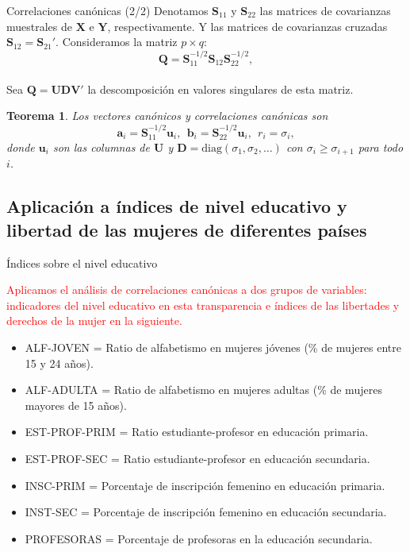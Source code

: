\documentclass{beamer}
\newtheorem{teor}{Teorema}[section]
\begin{document}
\begin{frame}{Correlaciones canónicas (2/2)}
Denotamos $\mathbf{S}_{11}$ y $\mathbf{S}_{22}$ las matrices de covarianzas muestrales de $\mathbf{X}$ e $\mathbf{Y}$, respectivamente. Y las matrices de covarianzas cruzadas $\mathbf{S}_{12} = \mathbf{S}_{21}'$.
Consideramos la matriz $p \times q$:
\begin{equation*}
    \mathbf{Q} = \mathbf{S}_{11}^{-1/2}\mathbf{S}_{12}\mathbf{S}_{22}^{-1/2},
\end{equation*}\\
Sea $\mathbf{Q = UDV'}$ la descomposición en valores singulares de esta matriz.
\begin{teor}
    Los vectores canónicos y correlaciones canónicas son
    \begin{equation*}
        \mathbf{a}_i = \mathbf{S}_{11}^{-1/2}\mathbf{u}_i,\ \  \mathbf{b}_i = \mathbf{S}_{22}^{-1/2}\mathbf{u}_i,\ \  r_i = \sigma_i,
    \end{equation*}
    donde $\mathbf{u}_i$ son las columnas de $\mathbf{U}$ y $\mathbf{D} = \mbox{diag}(\sigma_1, \sigma_2, \ldots)$ con $\sigma_i \geq \sigma_{i+1}$ para todo $i$.
\end{teor}
    
\end{frame}

\subsection{Aplicación a índices de nivel educativo y libertad de las mujeres de diferentes países}
\begin{frame}{Índices sobre el nivel educativo}
\begin{footnotesize}
\textcolor{red}{Aplicamos el análisis de correlaciones canónicas a dos grupos de variables: indicadores del nivel educativo en esta transparencia e índices de las libertades y derechos de la mujer en la siguiente.}
\begin{itemize}
    \item ALF-JOVEN = Ratio de alfabetismo en mujeres jóvenes (\% de mujeres entre 15 y 24 años).
    \item ALF-ADULTA = Ratio de alfabetismo en mujeres adultas (\% de mujeres mayores de 15 años).
    \item EST-PROF-PRIM = Ratio estudiante-profesor en educación primaria.
    \item EST-PROF-SEC = Ratio estudiante-profesor en educación secundaria.
    \item INSC-PRIM = Porcentaje de inscripción femenino en educación primaria.
    \item INST-SEC = Porcentaje de inscripción femenino en educación secundaria.
    \item PROFESORAS = Porcentaje de profesoras en la educación secundaria.
\end{itemize}
\end{footnotesize}
\end{frame}
\end{document}

